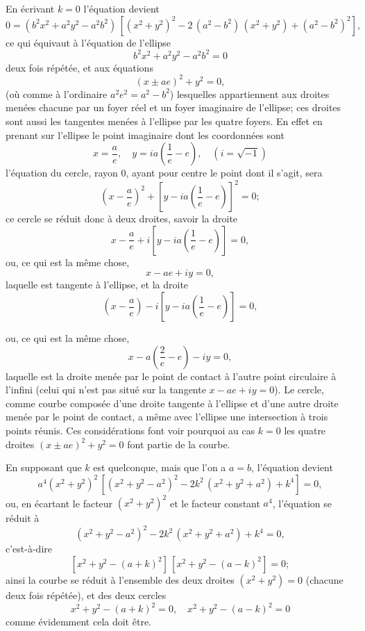 \documentclass[11pt,a4paper]{book}
\begin{document}
En \'{e}crivant $k=0$ l'\'{e}quation devient
\[
0 = (b^2x^2 + a^2y^2 - a^2b^2)\,[(x^2+y^2)^2 - 2\,(a^2-b^2)\,(x^2+y^2) + (a^2-b^2)^2],
\]
ce qui \'{e}quivaut \`{a} l'\'{e}quation de l'ellipse
\[
b^2x^2 + a^2y^2 - a^2b^2 = 0
\]
deux fois r\'{e}p\'{e}t\'{e}e, et aux \'{e}quations
\[
(x \pm ae)^2 + y^2 = 0,
\]
(o\`{u} comme \`{a} l'ordinaire $a^2e^2 = a^2 - b^2$) lesquelles appartiennent aux droites men\'{e}es chacune par un foyer r\'{e}el et un foyer imaginaire de l'ellipse; ces droites sont aussi les tangentes men\'{e}es \`{a} l'ellipse par les quatre foyers. En effet en prenant sur l'ellipse le point imaginaire dont les coordonn\'{e}es sont
\[
x = \frac{a}{e}, \quad y = ia\left(\frac{1}{e} - e\right), \quad (i = \sqrt{-1})
\]
l'\'{e}quation du cercle, rayon 0, ayant pour centre le point dont il s'agit, sera
\[
\left(x - \frac{a}{e}\right)^2 + \left[y - ia\left(\frac{1}{e} - e\right)\right]^2 = 0;
\]
ce cercle se r\'{e}duit donc \`{a} deux droites, savoir la droite
\[
x - \frac{a}{e} + i\left[y - ia\left(\frac{1}{e} - e\right)\right] = 0,
\]
ou, ce qui est la m\^{e}me chose,
\[
x - ae + iy = 0,
\]
laquelle est tangente \`{a} l'ellipse, et la droite
\[
\left(x - \frac{a}{e}\right) - i\left[y - ia\left(\frac{1}{e} - e\right)\right] = 0,
\]

\newpage
ou, ce qui est la m\^{e}me chose,
\[
x - a\left(\frac{2}{e} - e\right) - iy = 0,
\]
laquelle est la droite men\'{e}e par le point de contact \`{a} l'autre point circulaire \`{a} l'infini (celui qui n'est pas situ\'{e} sur la tangente $x - ae + iy = 0$). Le cercle, comme courbe compos\'{e}e d'une droite tangente \`{a} l'ellipse et d'une autre droite men\'{e}e par le point de contact, a m\^{e}me avec l'ellipse une intersection \`{a} trois points r\'{e}unis. Ces consid\'{e}rations font voir pourquoi au cas $k=0$ les quatre droites $(x \pm ae)^2 + y^2 = 0$ font partie de la courbe.

En supposant que $k$ est quelconque, mais que l'on a $a=b$, l'\'{e}quation devient
\[
a^4(x^2+y^2)^2\,[(x^2+y^2-a^2)^2 - 2k^2\,(x^2+y^2+a^2) + k^4] = 0,
\]
ou, en \'{e}cartant le facteur $(x^2+y^2)^2$ et le facteur constant $a^4$, l'\'{e}quation se r\'{e}duit \`{a}
\[
(x^2+y^2-a^2)^2 - 2k^2\,(x^2+y^2+a^2) + k^4 = 0,
\]
c'est-\`{a}-dire
\[
[x^2+y^2-(a+k)^2]\,[x^2+y^2-(a-k)^2] = 0;
\]
ainsi la courbe se r\'{e}duit \`{a} l'ensemble des deux droites $(x^2+y^2)=0$ (chacune deux fois r\'{e}p\'{e}t\'{e}e), et des deux cercles
\[
x^2+y^2-(a+k)^2=0, \quad x^2+y^2-(a-k)^2=0
\]
comme \'{e}videmment cela doit \^{e}tre.
\end{document}
